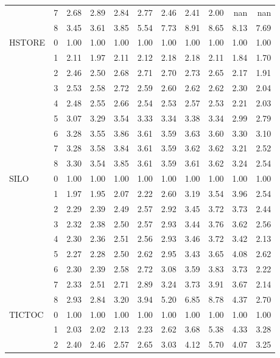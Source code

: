 \begin{tabular}{llrrrrrrrrr}
       & 7 & 2.68 & 2.89 & 2.84 & 2.77 & 2.46 & 2.41 & 2.00 &  nan &  nan \\
       & 8 & 3.45 & 3.61 & 3.85 & 5.54 & 7.73 & 8.91 & 8.65 & 8.13 & 7.69 \\
HSTORE & 0 & 1.00 & 1.00 & 1.00 & 1.00 & 1.00 & 1.00 & 1.00 & 1.00 & 1.00 \\
       & 1 & 2.11 & 1.97 & 2.11 & 2.12 & 2.18 & 2.18 & 2.11 & 1.84 & 1.70 \\
       & 2 & 2.46 & 2.50 & 2.68 & 2.71 & 2.70 & 2.73 & 2.65 & 2.17 & 1.91 \\
       & 3 & 2.53 & 2.58 & 2.72 & 2.59 & 2.60 & 2.62 & 2.62 & 2.30 & 2.04 \\
       & 4 & 2.48 & 2.55 & 2.66 & 2.54 & 2.53 & 2.57 & 2.53 & 2.21 & 2.03 \\
       & 5 & 3.07 & 3.29 & 3.54 & 3.33 & 3.34 & 3.38 & 3.34 & 2.99 & 2.79 \\
       & 6 & 3.28 & 3.55 & 3.86 & 3.61 & 3.59 & 3.63 & 3.60 & 3.30 & 3.10 \\
       & 7 & 3.28 & 3.58 & 3.84 & 3.61 & 3.59 & 3.62 & 3.62 & 3.21 & 2.52 \\
       & 8 & 3.30 & 3.54 & 3.85 & 3.61 & 3.59 & 3.61 & 3.62 & 3.24 & 2.54 \\
SILO & 0 & 1.00 & 1.00 & 1.00 & 1.00 & 1.00 & 1.00 & 1.00 & 1.00 & 1.00 \\
       & 1 & 1.97 & 1.95 & 2.07 & 2.22 & 2.60 & 3.19 & 3.54 & 3.96 & 2.54 \\
       & 2 & 2.29 & 2.39 & 2.49 & 2.57 & 2.92 & 3.45 & 3.72 & 3.73 & 2.44 \\
       & 3 & 2.32 & 2.38 & 2.50 & 2.57 & 2.93 & 3.44 & 3.76 & 3.62 & 2.56 \\
       & 4 & 2.30 & 2.36 & 2.51 & 2.56 & 2.93 & 3.46 & 3.72 & 3.42 & 2.13 \\
       & 5 & 2.27 & 2.28 & 2.50 & 2.62 & 2.95 & 3.43 & 3.65 & 4.08 & 2.62 \\
       & 6 & 2.30 & 2.39 & 2.58 & 2.72 & 3.08 & 3.59 & 3.83 & 3.73 & 2.22 \\
       & 7 & 2.33 & 2.51 & 2.71 & 2.89 & 3.24 & 3.73 & 3.91 & 3.67 & 2.14 \\
       & 8 & 2.93 & 2.84 & 3.20 & 3.94 & 5.20 & 6.85 & 8.78 & 4.37 & 2.70 \\
TICTOC & 0 & 1.00 & 1.00 & 1.00 & 1.00 & 1.00 & 1.00 & 1.00 & 1.00 & 1.00 \\
       & 1 & 2.03 & 2.02 & 2.13 & 2.23 & 2.62 & 3.68 & 5.38 & 4.33 & 3.28 \\
       & 2 & 2.40 & 2.46 & 2.57 & 2.65 & 3.03 & 4.12 & 5.70 & 4.07 & 3.25 \\

\end{tabular}
